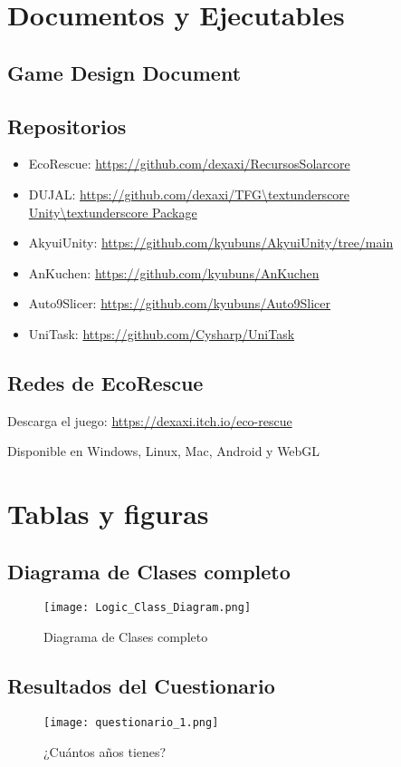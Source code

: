\section{Documentos y Ejecutables}
\subsection{Game Design Document}


\subsection{Repositorios}
\begin{itemize}
  \item EcoRescue: \url{https://github.com/dexaxi/RecursosSolarcore}
  \item DUJAL: \url{https://github.com/dexaxi/TFG\textunderscore Unity\textunderscore Package}
  \item AkyuiUnity: \url{https://github.com/kyubuns/AkyuiUnity/tree/main} 
  \item AnKuchen: \url{https://github.com/kyubuns/AnKuchen}
  \item Auto9Slicer: \url{https://github.com/kyubuns/Auto9Slicer}
  \item UniTask: \url{https://github.com/Cysharp/UniTask}
\end{itemize}

\subsection{Redes de EcoRescue}
Descarga el juego: \url{https://dexaxi.itch.io/eco-rescue}

Disponible en Windows, Linux, Mac, Android y WebGL

\section{Tablas y figuras}

\subsection{Diagrama de Clases completo}

\begin{figure}[H]
  \centering
  \texttt{[image: Logic\_Class\_Diagram.png]}
  \caption{Diagrama de Clases completo}
  \label{fig:logicUML}
\end{figure}
\raggedbottom


\subsection{Resultados del Cuestionario}
\begin{figure}[H]
  \centering
  \texttt{[image: questionario\_1.png]}
  \caption{¿Cuántos años tienes?}
  \label{fig:questionario_1}
\end{figure}
\raggedbottom

